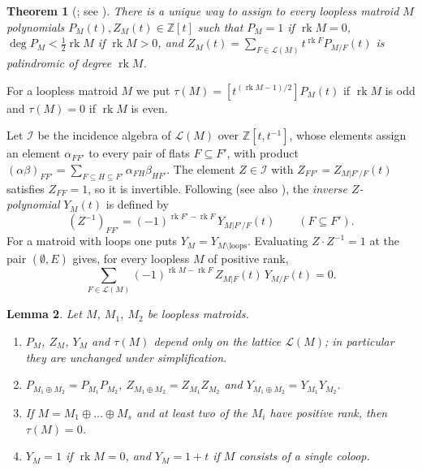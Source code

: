 \documentclass[11pt]{amsart}
\newtheorem{theorem}{Theorem}[section]
\newtheorem{lemma}[theorem]{Lemma}
\theoremstyle{definition}
\theoremstyle{remark}
\numberwithin{equation}{section}
\newcommand{\rk}{\operatorname{rk}}
\newcommand{\cL}{\mathcal{L}}
\begin{document}
\begin{theorem}[{\cite{PXY18,BV20}; see \cite[Theorem~2.1]{BFMN25}}]\label{thm:PZ}
There is a unique way to assign to every loopless matroid $M$ polynomials $P_M(t),Z_M(t)\in\mathbb{Z}[t]$ such that $P_M=1$ if $\rk M=0$, $\deg P_M<\frac12\rk M$ if $\rk M>0$, and $Z_M(t)=\sum_{F\in\cL(M)}t^{\rk F}P_{M/F}(t)$ is palindromic of degree $\rk M$.
\end{theorem}

For a loopless matroid $M$ we put $\tau(M)=[t^{(\rk M-1)/2}]P_M(t)$ if $\rk M$ is odd and $\tau(M)=0$ if $\rk M$ is even.

Let $\mathcal{I}$ be the incidence algebra of $\cL(M)$ over $\mathbb{Z}[t,t^{-1}]$, whose elements assign an element $\alpha_{FF'}$ to every pair of flats $F\subseteq F'$, with product $(\alpha\beta)_{FF'}=\sum_{F\subseteq H\subseteq F'}\alpha_{FH}\beta_{HF'}$. The element $Z\in\mathcal{I}$ with $Z_{FF'}=Z_{M|F'/F}(t)$ satisfies $Z_{FF}=1$, so it is invertible. Following \cite[Section~2.2]{BFMN25} (see also \cite[(2)--(3)]{GRX25}), the \emph{inverse $Z$-polynomial} $Y_M(t)$ is defined by
\begin{equation}\label{eq:defY}
(Z^{-1})_{FF'}=(-1)^{\rk F'-\rk F}\,Y_{M|F'/F}(t)\qquad(F\subseteq F').
\end{equation}
For a matroid with loops one puts $Y_M=Y_{M\setminus\mathrm{loops}}$. Evaluating $Z\cdot Z^{-1}=1$ at the pair $(\emptyset,E)$ gives, for every loopless $M$ of positive rank,
\begin{equation}\label{eq:convolution}
\sum_{F\in\cL(M)}(-1)^{\rk M-\rk F}\,Z_{M|F}(t)\,Y_{M/F}(t)=0.
\end{equation}

\begin{lemma}\label{lem:basic}
Let $M$, $M_1$, $M_2$ be loopless matroids.
\begin{enumerate}[label=\textup{(\alph*)}]
\item $P_M$, $Z_M$, $Y_M$ and $\tau(M)$ depend only on the lattice $\cL(M)$; in particular they are unchanged under simplification.
\item $P_{M_1\oplus M_2}=P_{M_1}P_{M_2}$, $Z_{M_1\oplus M_2}=Z_{M_1}Z_{M_2}$ and $Y_{M_1\oplus M_2}=Y_{M_1}Y_{M_2}$.
\item If $M=M_1\oplus\dots\oplus M_s$ and at least two of the $M_i$ have positive rank, then $\tau(M)=0$.
\item $Y_M=1$ if $\rk M=0$, and $Y_M=1+t$ if $M$ consists of a single coloop.
\end{enumerate}
\end{lemma}
\end{document}

